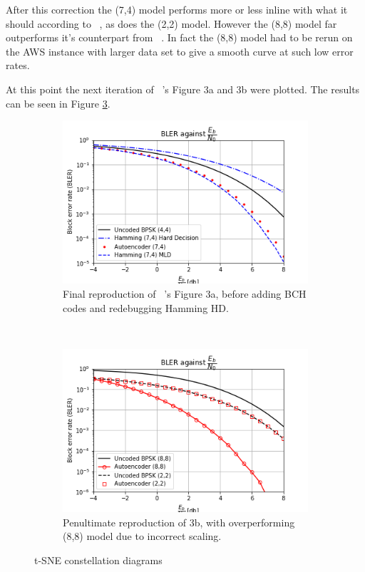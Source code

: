 \documentclass[12pt,onecolumn,letterpaper]{article}
\begin{document}
After this correction the (7,4) model performs more or less inline with what it should according to ~\cite{oShea}, as does the (2,2) model. However the (8,8) model far outperforms it's counterpart from ~\cite{oShea}. In fact the (8,8) model had to be rerun on the AWS instance with larger data set to give a smooth curve at such low error rates. 

At this point the next iteration of ~\cite{oShea}'s Figure 3a and 3b were plotted. The results can be seen in Figure \ref{fig:OSheaFig3Incorrect88}.

\begin{figure}[t!]
   \centering
  \begin{subfigure}[t]{0.45\textwidth}
       \centering
       \includegraphics[width=\linewidth]{figures/o_shea_3a_bler_vs_eb.png}
       \caption{Final reproduction of ~\cite{oShea}'s Figure 3a, before adding BCH codes and redebugging Hamming HD.}
       \label{fig:OSheaFigure3aIncorrect88}
   \end{subfigure}
   ~
   \begin{subfigure}[t]{0.45\textwidth}
       \centering
       \includegraphics[width=\linewidth]{figures/o_shea_3b_bler_vs_eb_88_scaled_incorrectly.png}
       \caption{Penultimate reproduction of 3b, with overperforming (8,8) model due to incorrect scaling.}
       \label{fig:OSheaFigure3bIncorrect88}
   \end{subfigure}
   \caption{t-SNE constellation diagrams}
   \label{fig:OSheaFig3Incorrect88}
\end{figure}
\end{document}
